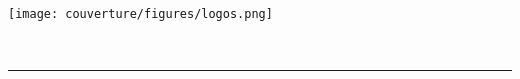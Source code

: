 \thispagestyle{empty}
\pagecolor{bleu}\afterpage{\nopagecolor}

\begin{center}
\texttt{[image: couverture/figures/logos.png]}	%
\end{center}

\vspace{3cm}
\begin{center}
{\huge \color{white} \sf \titre}
\vspace{2cm}
\\ {\color{white} \sf \Large  \auteur}

\vspace{4cm}
\begin{center}
{\color{white} \noindent\rule{2cm}{0.4pt}}
\end{center}
\vspace{1cm}
{\color{white} \sf \Large  \promoteur}
\vspace{1cm}
\\ {\color{white} \sf  \small  \master}
\\ {\color{white} \sf  \small  \annee}
\pagebreak

\end{center}